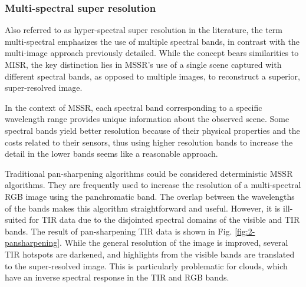         \subsubsection{Multi-spectral super resolution}

        Also referred to as hyper-spectral super resolution in the literature, the term multi-spectral emphasizes the use of multiple spectral bands, in contrast with the multi-image approach previously detailed. While the concept bears similarities to MISR, the key distinction lies in MSSR's use of a single scene captured with different spectral bands, as opposed to multiple images, to reconstruct a superior, super-resolved image.

        In the context of MSSR, each spectral band corresponding to a specific wavelength range provides unique information about the observed scene. Some spectral bands yield better resolution because of their physical properties and the costs related to their sensors, thus using higher resolution bands to increase the detail in the lower bands seems like a reasonable approach.

        Traditional pan-sharpening algorithms could be considered deterministic MSSR  algorithms. They are frequently used to increase the resolution of a multi-spectral RGB image using the panchromatic band. The overlap between the wavelengths of the bands makes this algorithm straightforward and useful. However, it is ill-suited for TIR data due to the disjointed spectral domains of the visible and TIR bands.
        The result of pan-sharpening TIR data is shown in Fig. \ref{fig:2-pansharpening}.  While the general resolution of the image is improved, several TIR hotspots are darkened, and highlights from the visible bands are translated to the super-resolved image. This is particularly problematic for clouds, which have an inverse spectral response in the TIR and RGB bands. 
        
